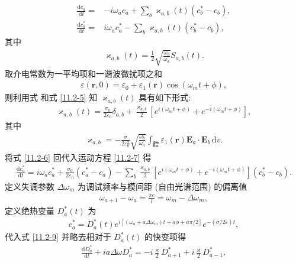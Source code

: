 \documentclass[twoside]{note}
\begin{document}
\begin{sol}
    \begin{align}
        \label{11.2-7}
        \frac{\mathrm{d}c_a}{\mathrm{d}t}=&-i\omega_ac_a+\sum_b\varkappa_{a,b}(t)(c_b^*-c_b),\\
        \label{11.2-8}
        \frac{\mathrm{d}c_a^*}{\mathrm{d}t}=&i\omega_ac_a^*-\sum_b\varkappa_{a,b}(t)(c_b^*-c_b),
    \end{align}
    其中
    \begin{align}
        \label{11.2-5}
        \varkappa_{a,b}(t)=\frac{1}{2}\sqrt{\frac{\omega_b}{\omega_a}}S_{a,b}(t).
    \end{align}
    取介电常数为一平均项和一谐波微扰项之和
    \begin{align}
        \varepsilon(\bm{r},0)=\varepsilon_0+\varepsilon_1(\bm{r})\cos(\omega_mt+\phi),
    \end{align}
    则利用式  和式 \eqref{11.2-5} 知 $\varkappa_{a,b}(t)$ 具有如下形式:
    \begin{align}
        \label{11.2-6}
        \varkappa_{a,b}(t)=\frac{\sigma_0}{2\varepsilon_0}\delta_{a,b}+\frac{\varkappa_{a,b}}{2}[e^{i(\omega_mt+\phi)}+e^{-i(\omega_mt+\phi)}],
    \end{align}
    其中
    \begin{align}
        \varkappa_{a,b}=-\frac{\sigma}{2\varepsilon_0^2}\sqrt{\frac{\omega_b}{\omega_a}}\int_{\text{腔}}\varepsilon_1(\bm{r})\bm{E}_a\cdot\bm{E}_b\,\mathrm{d}v.
    \end{align}
    将式 \eqref{11.2-6} 回代入运动方程 \eqref{11.2-7} 得
    \begin{align}
        \label{11.2-9}
        \frac{\mathrm{d}c_a^*}{\mathrm{d}t}=i\omega_ac_a^*+\frac{\sigma_0}{2\varepsilon_0}(c_a^*-c_a)-\sum_b\frac{\varkappa_{a,b}}{2}[e^{i(\omega_mt+\phi)}+e^{-i(\omega_mt+\phi)}](c_b^*-c_b).
    \end{align}
    定义失调参数 $\Delta\omega_m$ 为调试频率与模间距 (自由光谱范围) 的偏离值
    \begin{align}
        \omega_{a+1}-\omega_a=\frac{\pi c}{l}=\omega_m-\Delta\omega_m,
    \end{align}
    定义绝热变量 $D_a^*(t)$ 为
    \begin{align}
        c_a^*=D_a^*(t)e^{i[(\omega_a+a\Delta\omega_m)t+a\phi+a\pi/2]}e^{-(\sigma/2\varepsilon)t},
    \end{align}
    代入式 \eqref{11.2-9} 并略去相对于 $D_a^*(t)$ 的快变项得
    \begin{align}
        \frac{\mathrm{d}D_a^*}{\mathrm{d}t}+ia\Delta\omega D_a^*=-i\frac{\varkappa}{2}D_{a+1}^*+i\frac{\varkappa}{2}D_{a-1}^*,

\end{align}
\end{sol}
\end{document}
